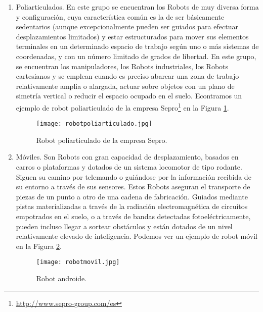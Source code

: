 \begin{enumerate}[1.]
	\item Poliarticulados. En este grupo se encuentran los Robots de muy diversa forma y configuración, cuya característica común es la de ser básicamente sedentarios (aunque excepcionalmente pueden ser guiados para efectuar desplazamientos limitados) y estar estructurados para mover sus elementos terminales en un determinado espacio de trabajo según uno o más sistemas de coordenadas, y con un número limitado de grados de libertad. En este grupo, se encuentran los manipuladores, los Robots industriales, los Robots cartesianos y se emplean cuando es preciso abarcar una zona de trabajo relativamente amplia o alargada, actuar sobre objetos con un plano de simetría vertical o reducir el espacio ocupado en el suelo. Econtramos un ejemplo de robot poliarticulado de la empresa Sepro\footnote{\url{http://www.sepro-group.com/es}} en la Figura \ref{fig:poliarticulado}.
	\begin{figure}[h]
		\centering\texttt{[image: robotpoliarticulado.jpg]}
		\caption{Robot poliarticulado de la empresa Sepro.}
		\label{fig:poliarticulado}
	\end{figure}
	
	\item Móviles. Son Robots con gran capacidad de desplazamiento, basados en carros o plataformas y dotados de un sistema locomotor de tipo rodante. Siguen su camino por telemando o guiándose por la información recibida de su entorno a través de sus sensores. Estos Robots aseguran el transporte de piezas de un punto a otro de una cadena de fabricación. Guiados mediante pistas materializadas a través de la radiación electromagnética de circuitos empotrados en el suelo, o a través de bandas detectadas fotoeléctricamente, pueden incluso llegar a sortear obstáculos y están dotados de un nivel relativamente elevado de inteligencia. Podemos ver un ejemplo de robot móvil en la Figura \ref{fig:movil}.
	\begin{figure}[h]
		\centering\texttt{[image: robotmovil.jpg]}
		\caption{Robot androide.}
		\label{fig:movil}
	\end{figure}	


\end{enumerate}
